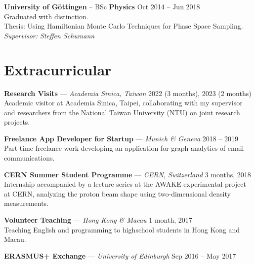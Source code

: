 \documentclass[11pt, a4paper]{article}
\newcommand{\dateright}[1]{\hfill{\small\color{accentblue} #1}}
\begin{document}
\vspace{0.2cm}

\noindent
\textbf{University of Göttingen} -- BSc \textbf{Physics} \dateright{Oct 2014 -- Jun 2018} \\
Graduated with distinction. \\
Thesis: Using Hamiltonian Monte Carlo Techniques for Phase Space Sampling. \\
\textit{Supervisor: Steffen Schumann}

\section*{Extracurricular}
\noindent
\textbf{Research Visits} — \textit{Academia Sinica, Taiwan} \dateright{2022 (3 months), 2023 (2 months)} \\
Academic visitor at Academia Sinica, Taipei, collaborating with my supervisor and researchers
from the National Taiwan University (NTU) on joint research projects.

\vspace{0.2cm}

\noindent
\textbf{Freelance App Developer for Startup} — \textit{Munich \& Geneva} \dateright{2018 -- 2019} \\
Part-time freelance work developing an
application for graph analytics of email communications.

\vspace{0.2cm}

\noindent
\textbf{CERN Summer Student Programme} — \textit{CERN, Switzerland} \dateright{3 months, 2018} \\
Internship accompanied by a lecture series at the AWAKE experimental project at CERN,
analyzing the proton beam shape using two-dimensional density measurements.

\vspace{0.2cm}

\noindent
\textbf{Volunteer Teaching} — \textit{Hong Kong \& Macau} \dateright{1 month, 2017} \\
Teaching English and programming to highschool students in Hong Kong and Macau.
\vspace{0.2cm}

\noindent
\textbf{ERASMUS+ Exchange} — \textit{University of Edinburgh} \dateright{Sep 2016 -- May 2017}
\end{document}
